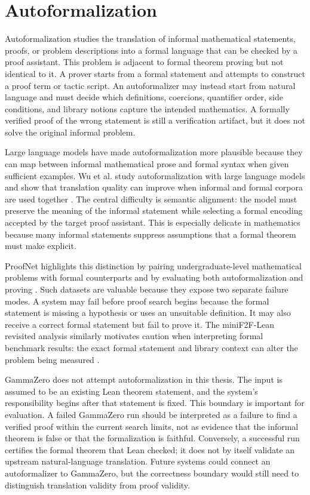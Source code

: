 \section{Autoformalization}

Autoformalization studies the translation of informal mathematical statements, proofs, or problem
descriptions into a formal language that can be checked by a proof assistant. This problem is adjacent to
formal theorem proving but not identical to it. A prover starts from a formal statement and attempts to
construct a proof term or tactic script. An autoformalizer may instead start from natural language and
must decide which definitions, coercions, quantifier order, side conditions, and library notions capture the
intended mathematics. A formally verified proof of the wrong statement is still a verification artifact, but
it does not solve the original informal problem.

Large language models have made autoformalization more plausible because they can map between
informal mathematical prose and formal syntax when given sufficient examples. Wu et al. study
autoformalization with large language models and show that translation quality can improve when
informal and formal corpora are used together \citep{wu2022autoformalization}. The central difficulty is
semantic alignment: the model must preserve the meaning of the informal statement while selecting a
formal encoding accepted by the target proof assistant. This is especially delicate in mathematics because
many informal statements suppress assumptions that a formal theorem must make explicit.

ProofNet highlights this distinction by pairing undergraduate-level mathematical problems with formal
counterparts and by evaluating both autoformalization and proving \citep{azerbayev2023proofnet}. Such
datasets are valuable because they expose two separate failure modes. A system may fail before proof
search begins because the formal statement is missing a hypothesis or uses an unsuitable definition. It
may also receive a correct formal statement but fail to prove it. The miniF2F-Lean revisited analysis
similarly motivates caution when interpreting formal benchmark results: the exact formal statement and
library context can alter the problem being measured \citep{ospanov2025minif2fLeanRevisited}.

GammaZero does not attempt autoformalization in this thesis. The input is assumed to be an existing
Lean theorem statement, and the system's responsibility begins after that statement is fixed. This boundary
is important for evaluation. A failed GammaZero run should be interpreted as a failure to find a verified
proof within the current search limits, not as evidence that the informal theorem is false or that the
formalization is faithful. Conversely, a successful run certifies the formal theorem that Lean checked; it
does not by itself validate an upstream natural-language translation. Future systems could connect an
autoformalizer to GammaZero, but the correctness boundary would still need to distinguish translation
validity from proof validity.

